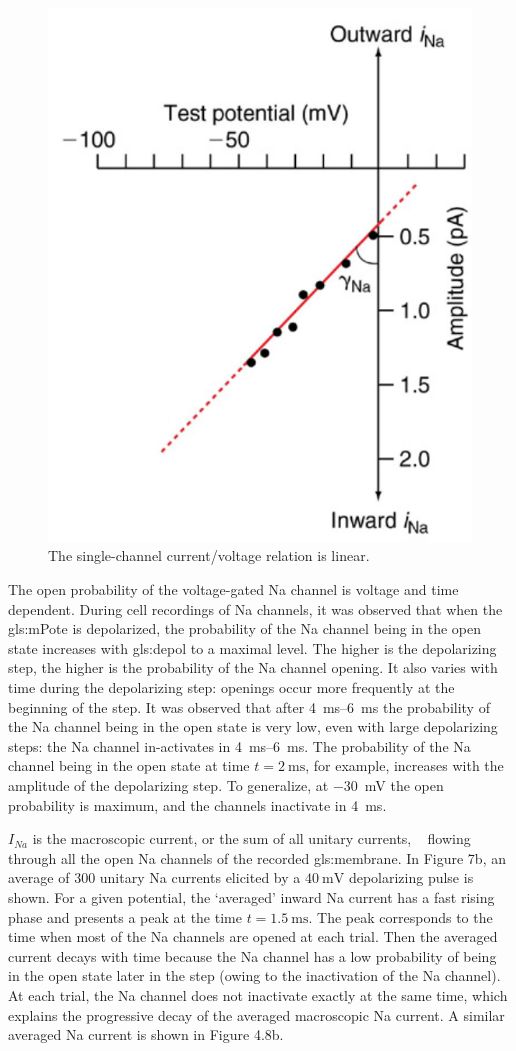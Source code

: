 \documentclass[../../Orator]{subfiles}
\begin{document}
\begin{figure}[H]
    \centering
    \includegraphics[width=0.5\linewidth]{Pictures//Anakin/iNa-VNa.png}
    \caption{The single-channel current/voltage \br{\unit[per-mode = symbol]{\cur\sodium\per\volt}} relation is linear. }
    \label{fig:enter-label}
\end{figure}
The open probability of the voltage-gated \gls{Na} channel is voltage and time dependent. During cell recordings of \gls{Na} channels, it was observed that when the \gls{gls:mPote} is depolarized, the probability of the \gls{Na} channel being in the open state increases with \gls{gls:depol} to a maximal level. The higher is the depolarizing step, the higher is the probability of the \gls{Na} channel opening. It also varies with time during the depolarizing step: openings occur more frequently at the beginning of the step. It was observed  that after \qtyrange{4}{6}{\ms} the probability of the \gls{Na} channel being in the open state is very low, even with large depolarizing steps: the \gls{Na} channel in-activates in \qtyrange{4}{6}{\ms}.  The probability of the \gls{Na} channel being in the open state at time \(t=\qty{2}{\ms}\), for example, increases with the amplitude of the depolarizing step. To generalize, at \qty{-30}{\mV} the open probability is maximum, and the channels inactivate in \qty{4}{\ms}. 

\(I_{Na}\) is the macroscopic current, or the sum of all unitary currents, \unit{\cur\sodium} flowing through all the open \gls{Na} channels of the recorded \gls{gls:membrane}. In Figure 7b, an average of \(\num{300}\) unitary \gls{Na} currents elicited by a \(\qty{40}{\mV}\) depolarizing pulse is shown. For a given potential, the ‘averaged’ inward \gls{Na} current has a fast rising phase and presents a peak at the time \(t=\qty{1.5}{\ms}\). The peak corresponds to the time when most of the \gls{Na} channels are opened at each trial. Then the averaged current decays with time because the \gls{Na} channel has a low probability of being in the open state later in the step (owing to the inactivation of the \gls{Na} channel). At each trial, the \gls{Na} channel does not inactivate exactly at the same time, which explains the progressive decay of the averaged macroscopic \gls{Na} current. A similar averaged \gls{Na} current is shown in Figure 4.8b. %
\end{document}

